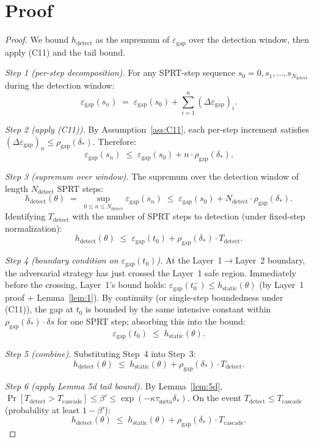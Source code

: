 \documentclass{article}
\newcommand{\deltastar}{\delta_{*}}
\newcommand{\rhogap}{\rho_{\mathrm{gap}}}
\newcommand{\epsgap}{\varepsilon_{\mathrm{gap}}}
\begin{document}
\section{Proof}

\begin{proof}
We bound $h_{\mathrm{detect}}$ as the supremum of $\epsgap$ over
the detection window, then apply (C11) and the tail bound.

\emph{Step 1 (per-step decomposition).}  For any SPRT-step
sequence $s_0 = 0, s_1, \ldots, s_{N_{\mathrm{detect}}}$ during the
detection window:
\[
  \epsgap(s_n) \;=\; \epsgap(s_0) + \sum_{i=1}^{n}
  (\Delta \epsgap)_i.
\]

\emph{Step 2 (apply (C11)).}  By Assumption~\ref{ass:C11}, each
per-step increment satisfies $(\Delta \epsgap)_n \leq
\rhogap(\deltastar)$.  Therefore:
\[
  \epsgap(s_n) \;\leq\; \epsgap(s_0) + n \cdot
  \rhogap(\deltastar).
\]

\emph{Step 3 (supremum over window).}  The supremum over the
detection window of length $N_{\mathrm{detect}}$ SPRT steps:
\[
  h_{\mathrm{detect}}(\theta) \;=\; \sup_{0 \leq n \leq
  N_{\mathrm{detect}}} \epsgap(s_n)
  \;\leq\; \epsgap(s_0) + N_{\mathrm{detect}} \cdot
  \rhogap(\deltastar).
\]
Identifying $T_{\mathrm{detect}}$ with the number of SPRT steps to
detection (under fixed-step normalization):
\[
  h_{\mathrm{detect}}(\theta) \;\leq\; \epsgap(t_0) +
  \rhogap(\deltastar) \cdot T_{\mathrm{detect}}.
\]

\emph{Step 4 (boundary condition on $\epsgap(t_0)$).}  At the
Layer~1$\to$Layer~2 boundary, the adversarial strategy has just
crossed the Layer~1 safe region.  Immediately before the crossing,
Layer~1's bound holds:
$\epsgap(t_0^-) \leq h_{\mathrm{static}}(\theta)$ (by Layer~1
proof + Lemma~\ref{lem:1}).
By continuity (or single-step boundedness under (C11)), the gap at
$t_0$ is bounded by the same intensive constant within
$\rhogap(\deltastar) \cdot \delta s$ for one SPRT step;
absorbing this into the bound:
\[
  \epsgap(t_0) \;\leq\; h_{\mathrm{static}}(\theta).
\]

\emph{Step 5 (combine).}  Substituting Step~4 into Step~3:
\[
  h_{\mathrm{detect}}(\theta) \;\leq\; h_{\mathrm{static}}(\theta)
  + \rhogap(\deltastar) \cdot T_{\mathrm{detect}}.
\]

\emph{Step 6 (apply Lemma 5d tail bound).}  By Lemma~\ref{lem:5d},
$\Pr[T_{\mathrm{detect}} > T_{\mathrm{cascade}}] \leq \beta' \leq
\exp(-\kappa \tau_{\mathrm{meta}} \deltastar)$.  On the event
$T_{\mathrm{detect}} \leq T_{\mathrm{cascade}}$ (probability at
least $1 - \beta'$):
\[
  h_{\mathrm{detect}}(\theta) \;\leq\; h_{\mathrm{static}}(\theta)
  + \rhogap(\deltastar) \cdot T_{\mathrm{cascade}}.
\]


\end{proof}
\end{document}

